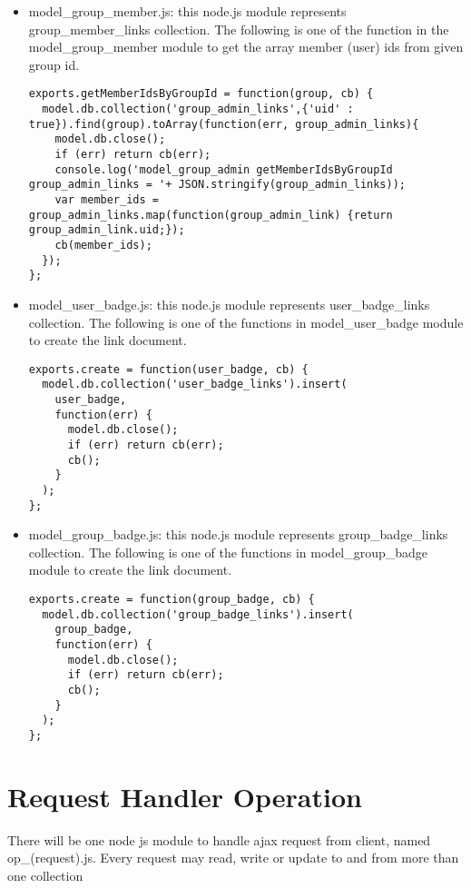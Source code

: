 \begin{itemize}
\item model{\_}group{\_}member.js: this node.js module represents group{\_}member{\_}links collection. The following is one of the function in the model{\_}group{\_}member module to get the array member (user) ids from given group id.

\begin{lstlisting}
exports.getMemberIdsByGroupId = function(group, cb) {
  model.db.collection('group_admin_links',{'uid' : true}).find(group).toArray(function(err, group_admin_links){
    model.db.close();
    if (err) return cb(err);
    console.log('model_group_admin getMemberIdsByGroupId  group_admin_links = '+ JSON.stringify(group_admin_links));
    var member_ids = group_admin_links.map(function(group_admin_link) {return group_admin_link.uid;});
    cb(member_ids);
  });    
};
\end{lstlisting}
 
\item model{\_}user{\_}badge.js: this node.js module represents user{\_}badge{\_}links collection. The following is one of the functions in model{\_}user{\_}badge module to create the link document.

\begin{lstlisting}
exports.create = function(user_badge, cb) {
  model.db.collection('user_badge_links').insert(
    user_badge,
    function(err) {
      model.db.close();
      if (err) return cb(err); 
      cb();
    }
  );
};
\end{lstlisting}

\item model{\_}group{\_}badge.js: this node.js module represents group{\_}badge{\_}links collection. The following is one of the functions in model{\_}group{\_}badge module to create the link document.

\begin{lstlisting}
exports.create = function(group_badge, cb) {
  model.db.collection('group_badge_links').insert(
    group_badge,
    function(err) {
      model.db.close();
      if (err) return cb(err); 
      cb();
    }
  );
};
\end{lstlisting}

\end{itemize}

\section{Request Handler Operation}
There will be one node js module to handle ajax request from client, named op{\_}(request).js. Every request may read, write or update to and from more than one collection


